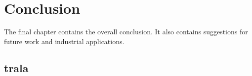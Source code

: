 \chapter{Conclusion}
\label{cha:conclusion}
The final chapter contains the overall conclusion. It also contains
suggestions for future work and industrial applications.


\section{trala}
